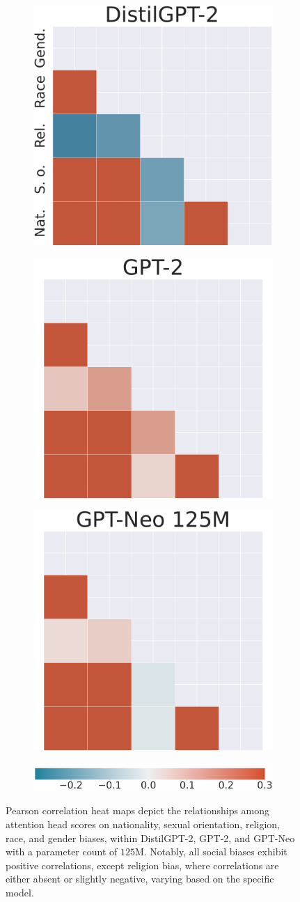 \documentclass[letterpaper]{article} %
\begin{document}
\begin{figure}[]
     \centering
    \begin{subfigure}
    \centering    \includegraphics[width=0.31\linewidth]{figures/corr_head_effects_different_biases_DistilGPT-2_3.pdf}
     \end{subfigure}
   \begin{subfigure}
    \centering    \includegraphics[width=0.31\linewidth]{figures/corr_head_effects_different_biases_GPT-2_2.pdf}
     \end{subfigure}
     \begin{subfigure}
    \centering    \includegraphics[width=0.31\linewidth]{figures/corr_head_effects_different_biases_GPT-Neo_125M_3.pdf}
     \end{subfigure}

     \begin{subfigure}
    \centering    \includegraphics[width=0.45\linewidth]{figures/corr_heatmap_legend.png}
     \end{subfigure}     

        \caption{Pearson correlation heat maps depict the relationships among attention head scores on nationality, sexual orientation, religion, race, and gender biases, within DistilGPT-2, GPT-2, and GPT-Neo with a parameter count of $125$M. Notably, all social biases exhibit positive correlations, except religion bias, where correlations are either absent or slightly negative, varying based on the specific model.}
        \label{fig:correlation_maps}
\end{figure}
\end{document}
